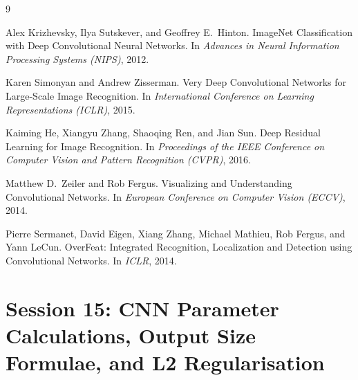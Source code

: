 \documentclass[12pt,a4paper]{article}
\begin{document}
\begin{thebibliography}{9}

Alex Krizhevsky, Ilya Sutskever, and Geoffrey E.\ Hinton.
\newblock ImageNet Classification with Deep Convolutional Neural Networks.
\newblock In \emph{Advances in Neural Information Processing Systems (NIPS)}, 2012.

Karen Simonyan and Andrew Zisserman.
\newblock Very Deep Convolutional Networks for Large-Scale Image Recognition.
\newblock In \emph{International Conference on Learning Representations (ICLR)}, 2015.

Kaiming He, Xiangyu Zhang, Shaoqing Ren, and Jian Sun.
\newblock Deep Residual Learning for Image Recognition.
\newblock In \emph{Proceedings of the IEEE Conference on Computer Vision and Pattern Recognition (CVPR)}, 2016.

Matthew D.\ Zeiler and Rob Fergus.
\newblock Visualizing and Understanding Convolutional Networks.
\newblock In \emph{European Conference on Computer Vision (ECCV)}, 2014.

Pierre Sermanet, David Eigen, Xiang Zhang, Michael Mathieu, Rob Fergus, and Yann LeCun.
\newblock OverFeat: Integrated Recognition, Localization and Detection using Convolutional Networks.
\newblock In \emph{ICLR}, 2014.

\end{thebibliography}

\clearpage

\part{Session 15: CNN Parameter Calculations, Output Size Formulae, and L2 Regularisation}
\end{document}
